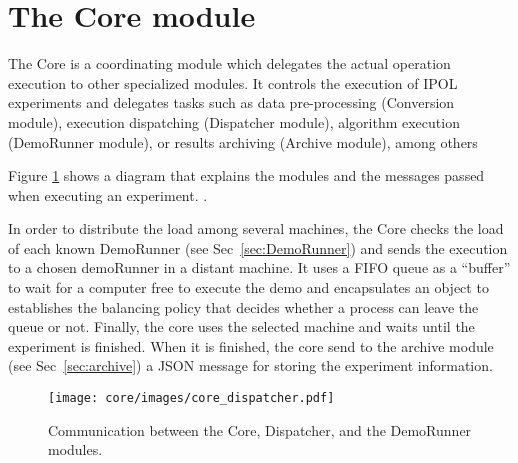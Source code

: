 \section{The Core module}
The Core is a coordinating module which delegates the actual operation execution to other specialized modules. It controls the execution of IPOL experiments and delegates tasks such as data pre-processing (Conversion module), execution dispatching (Dispatcher module), algorithm execution (DemoRunner module), or results archiving (Archive module), among others

Figure \ref{fig:core_diagram} shows a diagram that explains the modules and the messages passed when executing an experiment. .

In order to distribute the load among several machines, the Core checks the load of each known DemoRunner (see Sec~\ref{sec:DemoRunner}) and sends the execution to a chosen demoRunner in a distant machine. It uses a FIFO queue as a ``buffer'' to wait for a computer free to execute the demo and encapsulates an object to establishes the balancing policy that decides whether a process can leave the queue or not. Finally, the core uses the selected machine and waits until the experiment is finished. When it is finished, the core send to the archive module (see Sec~\ref{sec:archive}) a JSON message for storing the experiment information.

\begin{figure}[!ht]
\centering
\texttt{[image: core/images/core\_dispatcher.pdf]}
\caption{Communication between the Core, Dispatcher, and the DemoRunner modules.}
\label{fig:core_diagram}
\end{figure}


